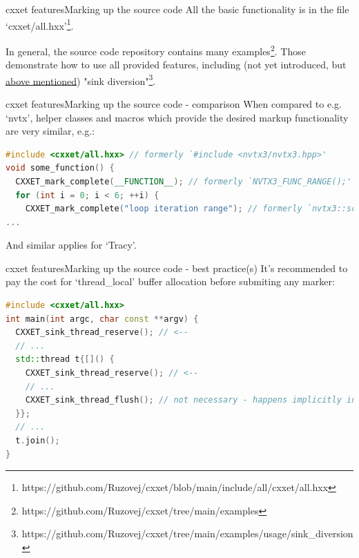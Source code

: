 \documentclass[aspectratio=169]{beamer}
\begin{document}
\begin{frame}{cxxet features}{Marking up the source code}
    All the basic functionality is in the file `cxxet/all.hxx'\footnote{https://github.com/Ruzovej/cxxet/blob/main/include/all/cxxet/all.hxx}.

    In general, the source code repository contains many examples\footnote{https://github.com/Ruzovej/cxxet/tree/main/examples}. Those demonstrate how to use all provided features, including (not yet introduced, but \hyperlink{fork_handling}{above mentioned}) "sink diversion"\footnote{https://github.com/Ruzovej/cxxet/tree/main/examples/usage/sink\_diversion}.

\end{frame}

\begin{frame}[fragile]{cxxet features}{Marking up the source code - comparison}
    When compared to e.g. `nvtx', helper classes and macros which provide the desired markup functionality are very similar, e.g.:

    \begin{lstlisting}[language=C++]
#include <cxxet/all.hxx> // formerly `#include <nvtx3/nvtx3.hpp>'
void some_function() {
  CXXET_mark_complete(__FUNCTION__); // formerly `NVTX3_FUNC_RANGE();'
  for (int i = 0; i < 6; ++i) {
    CXXET_mark_complete("loop iteration range"); // formerly `nvtx3::scoped_range loop{"loop iteration range"};'
...
    \end{lstlisting}

    And similar applies for `Tracy'.

\end{frame}

\begin{frame}[fragile]{cxxet features}{Marking up the source code - best practice(s)}
    It's recommended to pay the cost for `thread\_local' buffer allocation before submiting any marker:

    \begin{lstlisting}[language=C++]
#include <cxxet/all.hxx>
int main(int argc, char const **argv) {
  CXXET_sink_thread_reserve(); // <--
  // ...
  std::thread t{[]() {
    CXXET_sink_thread_reserve(); // <--
    // ...
    CXXET_sink_thread_flush(); // not necessary - happens implicitly in the internal `thread_local' object destructor
  }};
  // ...
  t.join();
}
    \end{lstlisting}

\end{frame}
\end{document}
